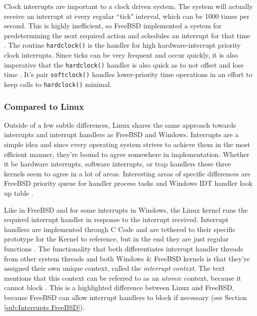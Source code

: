 \par Clock interrupts are important to a clock driven system.
The system will actually receive an interrupt at every regular ``tick" interval, which can be 1000 times per second.
This is highly inefficient, so FreeBSD implemented a system for predetermining the next required action and schedules an interrupt for that time \cite{bsd:1}.
The routine \texttt{hardclock()} is the handler for high hardware-interrupt priority clock interrupts.
Since ticks can be very frequent and occur quickly, it is also imperative that the \texttt{hardclock()} handler is also quick as to not offset and lose time \cite{bsd:1}.
It's pair \texttt{softclock()} handles lower-priority time operations in an effort to keep calls to \texttt{hardclock()} minimal.

\subsubsection{Compared to Linux}
\label{sub:Interrupts Linux}
\par Outside of a few subtle differences, Linux shares the same approach towards interrupts and interrupt handlers as FreeBSD and Windows.
Interrupts are a simple idea and since every operating system strives to achieve them in the most efficient manner, they're bound to agree somewhere in implementation.
Whether it be hardware interrupts, software interrupts, or trap handlers these three kernels seem to agree in a lot of areas.
Interesting areas of specific differences are FreeBSD priority queue for handler process tasks and Windows IDT handler look up table \cite{bsd:1} \cite{win:1}.

\par Like in FreeBSD and for some interrupts in Windows, the Linux kernel runs the required interrupt handler in response to the interrupt received.
Interrupt handlers are implemented through C Code and are tethered to their specific prototype for the Kernel to reference, but in the end they are just regular functions \cite{linux:1}.
The functionality that both differentiates interrupt handler threads from other system threads and both Windows \& FreeBSD kernels is that they're assigned their own unique context, called the \textit{interrupt context}.
The text mentions that this context can be referred to as an \textit{atomic} context, because it cannot block \cite{linux:1}.
This is a highlighted difference between Linux and FreeBSD, because FreeBSD can allow interrupt handlers to block if necessary (see Section \ref{sub:Interrupts FreeBSD}).

